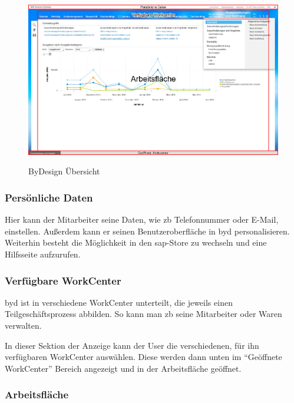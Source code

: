 \begin{figure}[H]
	\begin{center}
	\includegraphics[width=1.0\textwidth]{grafiken/ByDesign-Ubersicht.png}
	\caption{ByDesign Übersicht}
	\vspace{-10pt}
	\label{abb:byd-overview}
	\end{center}
\end{figure}

\subsubsection{Persönliche Daten}

Hier kann der Mitarbeiter seine Daten, wie \gls{zb} Telefonnummer oder E-Mail, einstellen. Außerdem kann er seinen Benutzeroberfläche in \gls{byd} personalisieren. Weiterhin besteht die Möglichkeit in den \gls{sap}-Store zu wechseln und eine Hilfsseite aufzurufen.

\subsubsection{Verfügbare WorkCenter}

\gls{byd} ist in verschiedene WorkCenter unterteilt, die jeweils einen Teilgeschäftsprozess abbilden. So kann man \gls{zb} seine Mitarbeiter oder Waren verwalten.

In dieser Sektion der Anzeige kann der User die verschiedenen, für ihn verfügbaren WorkCenter auswählen. Diese werden dann unten im "`Geöffnete WorkCenter"' Bereich angezeigt und in der Arbeitsfläche geöffnet.

\subsubsection{Arbeitsfläche}

